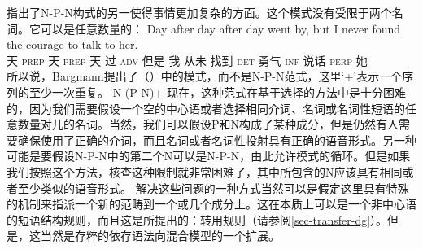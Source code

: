 %
 \citet{Bargmann2015a}指出了N-P-N构式的另一使得事情更加复杂的方面。这个模式没有受限于两个名词。它可以是任意数量的：
\ea
\gll Day after day after day went by, but I never found the courage to talk to her.\\
天 \textsc{prep} 天 \textsc{prep} 天 过 \textsc{adv} 但是 我 从未 找到 \textsc{det} 勇气 \textsc{inf} 说话 \textsc{perp} 她\\
\z
所以说，Bargmann提出了（）中的模式，而不是N-P-N范式，这里`+'\isc{$+$}\is{$+$}表示一个序列的至少一次重复。
\ea
\label{n-p-n-plus-cx}
N (P N)+
\z
现在，这种范式在基于选择的方法中是十分困难的，因为我们需要假设一个空的中心语或者选择相同介词、名词或名词性短语的任意数量对儿的名词。当然，我们可以假设P和N构成了某种成分，但是仍然有人需要确保使用了正确的介词，而且名词或者名词性投射具有正确的语音形式。另一种可能是要假设N-P-N中的第二个N可以是N-P-N，由此允许模式的循环。但是如果我们按照这个方法，核查这种限制就非常困难了，其中所包含的N应该具有相同或者至少类似的语音形式。
%
解决这些问题的一种方式当然可以是假定这里具有特殊的机制来指派一个新的范畴到一个或几个成分上。这在本质上可以是一个非中心语的短语结构规则，而且这是\tes 所提出的：转用规则（请参阅\ref{sec-transfer-dg}）。但是，这当然是存粹的依存语法向混合模型的一个扩展。
